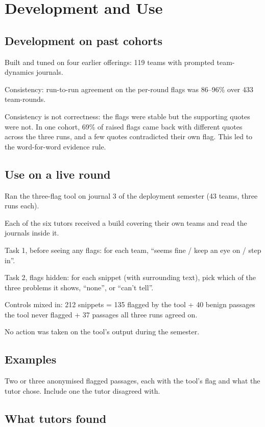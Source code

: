 \section{Development and Use}
\label{sec:practice}

\subsection{Development on past cohorts}
\begin{outline}
  \item Built and tuned on four earlier offerings: 119 teams with prompted team-dynamics
    journals.
  \item Consistency: run-to-run agreement on the per-round flags was 86--96\% over 433
    team-rounds.
  \item Consistency is not correctness: the flags were stable but the supporting quotes
    were not. In one cohort, 69\% of raised flags came back with different quotes across the
    three runs, and a few quotes contradicted their own flag. This led to the
    word-for-word evidence rule.
\end{outline}

\subsection{Use on a live round}
\begin{outline}
  \item Ran the three-flag tool on journal 3 of the deployment semester (43 teams, three
    runs each).
  \item Each of the six tutors received a build covering their own teams
     and read the journals inside it.
  \item Task 1, before seeing any flags: for each team, ``seems fine / keep an eye on /
    step in''.
  \item Task 2, flags hidden: for each snippet (with surrounding text), pick which of the
    three problems it shows, ``none'', or ``can't tell''.
  \item Controls mixed in: 212 snippets = 135 flagged by the tool + 40 benign passages the
    tool never flagged + 37 passages all three runs agreed on.
  \item No action was taken on the tool's output during the semester.
\end{outline}

\subsection{Examples}
\begin{outline}
  \item Two or three anonymised flagged passages, each with the tool's flag and what the
    tutor chose. Include one the tutor disagreed with.
\end{outline}

\subsection{What tutors found}
\begin{outline}
  \item {}
\end{outline}
